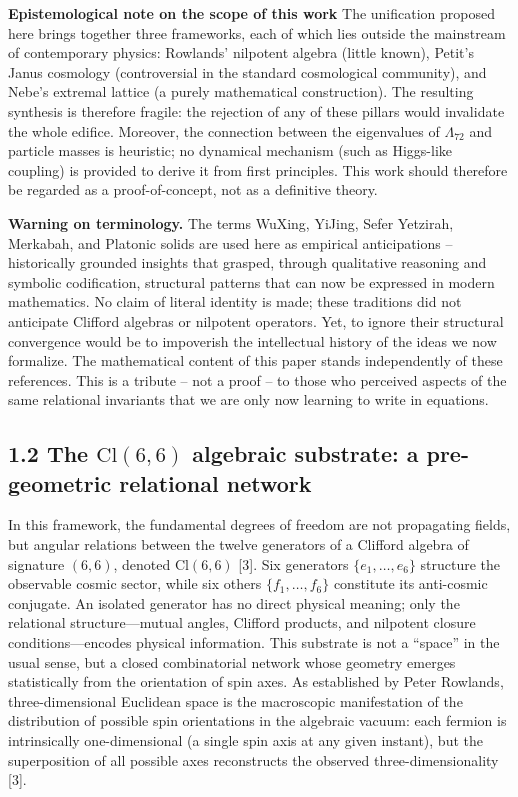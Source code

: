 \documentclass[11pt]{article}
\begin{document}
\textbf{Epistemological note on the scope of this work} The unification
proposed here brings together three frameworks, each of which lies
outside the mainstream of contemporary physics: Rowlands' nilpotent
algebra (little known), Petit's Janus cosmology (controversial in the
standard cosmological community), and Nebe's extremal lattice (a purely
mathematical construction). The resulting synthesis is therefore
fragile: the rejection of any of these pillars would invalidate the
whole edifice. Moreover, the connection between the eigenvalues of
\(\Lambda_{72}\) and particle masses is heuristic; no dynamical
mechanism (such as Higgs-like coupling) is provided to derive it from
first principles. This work should therefore be regarded as a
proof-of-concept, not as a definitive theory.

\textbf{Warning on terminology.} The terms WuXing, YiJing, Sefer
Yetzirah, Merkabah, and Platonic solids are used here as empirical
anticipations -- historically grounded insights that grasped, through
qualitative reasoning and symbolic codification, structural patterns
that can now be expressed in modern mathematics. No claim of literal
identity is made; these traditions did not anticipate Clifford algebras
or nilpotent operators. Yet, to ignore their structural convergence
would be to impoverish the intellectual history of the ideas we now
formalize. The mathematical content of this paper stands independently
of these references. This is a tribute -- not a proof -- to those who
perceived aspects of the same relational invariants that we are only now
learning to write in equations.

\hypertarget{the-textcl66-algebraic-substrate-a-pre-geometric-relational-network}{%
\subsection{\texorpdfstring{1.2 The \(\text{Cl}(6,6)\) algebraic
substrate: a pre-geometric relational
network}{1.2 The \textbackslash text\{Cl\}(6,6) algebraic substrate: a pre-geometric relational network}}\label{the-textcl66-algebraic-substrate-a-pre-geometric-relational-network}}

In this framework, the fundamental degrees of freedom are not
propagating fields, but angular relations between the twelve generators
of a Clifford algebra of signature \((6,6)\), denoted \(\text{Cl}(6,6)\)
{[}3{]}. Six generators \(\{e_1,\dots,e_6\}\) structure the observable
cosmic sector, while six others \(\{f_1,\dots,f_6\}\) constitute its
anti-cosmic conjugate. An isolated generator has no direct physical
meaning; only the relational structure---mutual angles, Clifford
products, and nilpotent closure conditions---encodes physical
information. This substrate is not a ``space'' in the usual sense, but a
closed combinatorial network whose geometry emerges statistically from
the orientation of spin axes. As established by Peter Rowlands,
three-dimensional Euclidean space is the macroscopic manifestation of
the distribution of possible spin orientations in the algebraic vacuum:
each fermion is intrinsically one-dimensional (a single spin axis at any
given instant), but the superposition of all possible axes reconstructs
the observed three-dimensionality {[}3{]}.
\end{document}

